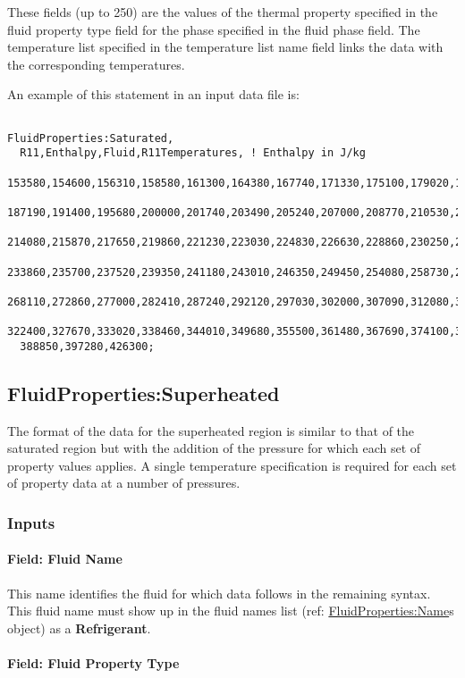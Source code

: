 These fields (up to 250) are the values of the thermal property specified in the fluid property type field for the phase specified in the fluid phase field. The temperature list specified in the temperature list name field links the data with the corresponding temperatures.

An example of this statement in an input data file is:

\begin{lstlisting}

FluidProperties:Saturated,
  R11,Enthalpy,Fluid,R11Temperatures, ! Enthalpy in J/kg
  153580,154600,156310,158580,161300,164380,167740,171330,175100,179020,183060,
  187190,191400,195680,200000,201740,203490,205240,207000,208770,210530,212310,
  214080,215870,217650,219860,221230,223030,224830,226630,228860,230250,232060,
  233860,235700,237520,239350,241180,243010,246350,249450,254080,258730,263480,
  268110,272860,277000,282410,287240,292120,297030,302000,307090,312080,317210,
  322400,327670,333020,338460,344010,349680,355500,361480,367690,374100,381060,
  388850,397280,426300;
\end{lstlisting}

\subsection{FluidProperties:Superheated}\label{fluidpropertiessuperheated}

The format of the data for the superheated region is similar to that of the saturated region but with the addition of the pressure for which each set of property values applies. A single temperature specification is required for each set of property data at a number of pressures.

\subsubsection{Inputs}\label{inputs-4-014}

\paragraph{Field: Fluid Name}\label{field-fluid-name-1}

This name identifies the fluid for which data follows in the remaining syntax. This fluid name must show up in the fluid names list (ref: \hyperref[fluidpropertiesname]{FluidProperties:Name}s object) as a \textbf{Refrigerant}.

\paragraph{Field: Fluid Property Type}\label{field-fluid-property-type-1}

